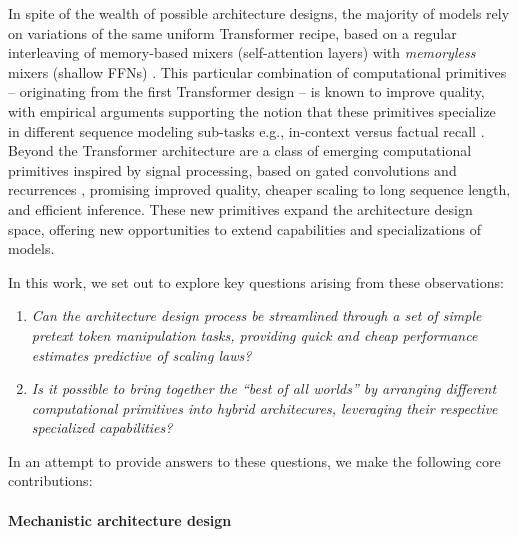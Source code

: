 In spite of the wealth of possible architecture designs, the majority of models rely on variations of the same uniform Transformer recipe, based on a regular interleaving of memory-based mixers (self-attention layers) with \textit{memoryless} mixers (shallow FFNs) \cite{touvron2023llama,jiang2023mistral}. This particular combination of computational primitives -- originating from the first Transformer design \cite{vaswani2017attention} -- is known to improve quality, with empirical arguments supporting the notion that these primitives specialize in different sequence modeling sub-tasks e.g., in-context versus factual recall \cite{geva2023dissecting}. Beyond the Transformer architecture are a class of emerging computational primitives inspired by signal processing, based on gated convolutions and recurrences \cite{katharopoulos2020transformers,peng2023rwkv,poli2023hyena,nguyen2023hyenadna,gu2023mamba,yang2023gated}, promising improved quality, cheaper scaling to long sequence length, and efficient inference. These new primitives expand the architecture design space, offering new opportunities to extend capabilities and specializations of models.

In this work, we set out to explore key questions arising from these observations:

\begin{enumerate}
    \item \textit{Can the architecture design process be streamlined through a set of simple pretext token manipulation tasks, providing quick and cheap performance estimates predictive of scaling laws?}
    \item \textit{Is it possible to bring together the ``best of all worlds'' by arranging different computational primitives into hybrid architecures, leveraging their respective specialized capabilities?}
\end{enumerate}

In an attempt to provide answers to these questions, we make the following core contributions:

\paragraph{Mechanistic architecture design}

